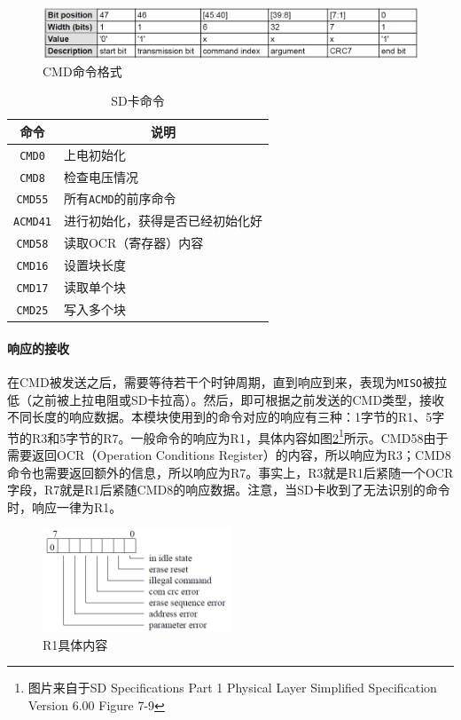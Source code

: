 \documentclass[11pt,utf8]{report}
\begin{document}
	\begin{figure}[h!]
		\centering
		\includegraphics[width=\textwidth]{cmd}
		\caption{CMD命令格式}
		\label{cmd}
	\end{figure}
	
	\begin{table}[h]
	\centering
	\begin{tabular}{c|l}
	\toprule[1.2pt]
	\multicolumn{1}{c|}{\textbf{命令}} & \multicolumn{1}{c}{\textbf{说明}} \\
	\midrule[1.2pt]
	\texttt{CMD0} & 上电初始化 \\ \hline
	\texttt{CMD8} & 检查电压情况 \\ \hline
	\texttt{CMD55} & 所有\texttt{ACMD}的前序命令 \\ \hline
	\texttt{ACMD41} & 进行初始化，获得是否已经初始化好 \\ \hline
	\texttt{CMD58} & 读取OCR（寄存器）内容 \\ \hline
	\texttt{CMD16} & 设置块长度 \\ \hline
	\texttt{CMD17} & 读取单个块 \\ \hline
	\texttt{CMD25} & 写入多个块 \\
	\bottomrule[1.2pt]
	\end{tabular}
	\caption{SD卡命令}
	\label{cmds}
	\end{table}
	
	\paragraph{响应的接收} 在CMD被发送之后，需要等待若干个时钟周期，直到响应到来，表现为\texttt{MISO}被拉低（之前被上拉电阻或SD卡拉高）。然后，即可根据之前发送的CMD类型，接收不同长度的响应数据。本模块使用到的命令对应的响应有三种：1字节的R1、5字节的R3和5字节的R7。一般命令的响应为R1，具体内容如图\ref{r1}\footnote{图片来自于SD Specifications Part 1 Physical Layer Simplified Specification Version 6.00 Figure 7-9}所示。CMD58由于需要返回OCR（Operation Conditions Register）的内容，所以响应为R3；CMD8命令也需要返回额外的信息，所以响应为R7。事实上，R3就是R1后紧随一个OCR字段，R7就是R1后紧随CMD8的响应数据。注意，当SD卡收到了无法识别的命令时，响应一律为R1。
	
	\begin{figure}[h!]
		\centering
		\includegraphics[width=0.5\textwidth]{r1}
		\caption{R1具体内容}
		\label{r1}
	\end{figure}
\end{document}
